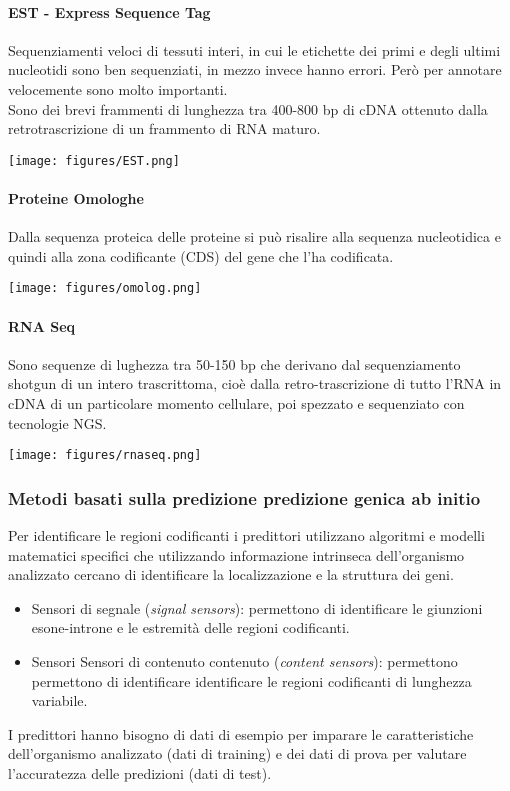 \documentclass{article}
\begin{document}
\paragraph{EST - Express Sequence Tag}
Sequenziamenti veloci di tessuti interi, in cui le etichette dei primi e degli ultimi nucleotidi sono ben sequenziati, in mezzo invece hanno errori. Però per annotare velocemente sono molto importanti.\\
Sono dei brevi frammenti di lunghezza tra 400-800 bp di cDNA
ottenuto dalla retrotrascrizione di un frammento di RNA maturo.
\begin{center}
    \texttt{[image: figures/EST.png]}
\end{center}
\paragraph{Proteine Omologhe}
Dalla sequenza proteica delle proteine si può risalire alla
sequenza nucleotidica e quindi alla zona codificante (CDS) del
gene che l'ha codificata.
\begin{center}
    \texttt{[image: figures/omolog.png]}
\end{center}
\paragraph{RNA Seq}
Sono sequenze di lughezza tra 50-150 bp che derivano dal sequenziamento shotgun di un
intero trascrittoma, cioè dalla retro-trascrizione di tutto l'RNA in cDNA di un particolare
momento cellulare, poi spezzato e sequenziato con tecnologie NGS.
\begin{center}
    \texttt{[image: figures/rnaseq.png]}
\end{center}
\subsubsection{Metodi basati sulla predizione predizione genica ab initio}
Per identificare le regioni codificanti i predittori utilizzano algoritmi e modelli
matematici specifici che utilizzando informazione intrinseca dell'organismo
analizzato cercano di identificare la localizzazione e la struttura dei geni.
\begin{itemize}
    \item Sensori di segnale (\textit{signal sensors}): permettono di identificare le giunzioni
    esone-introne e le estremità delle regioni codificanti.
    \item Sensori Sensori di contenuto contenuto (\textit{content sensors}): permettono permettono di identificare identificare le
    regioni codificanti di lunghezza variabile.
\end{itemize}
I predittori hanno bisogno di dati di esempio per imparare le caratteristiche
dell'organismo analizzato (dati di training) e dei dati di prova per valutare
l'accuratezza delle predizioni (dati di test).
\end{document}
